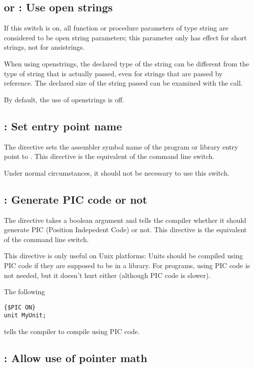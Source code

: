 \subsection{ or  : Use open strings}

If this switch is on, all function or procedure parameters of type string
are considered to be open string parameters; this parameter only has effect
for short strings, not for ansistrings.

When using openstrings, the declared type of the string can be different
from the type of string that is actually passed, even for strings that are
passed by reference. The declared size of the string passed can be examined
with the  call.

By default, the use of openstrings is off.

\subsection{ : Set entry point name}
\label{se:Pascalmainname}
The  directive sets the assembler
symbol name of the program or library entry point to .
This directive is the equivalent of the  command line switch.

Under normal circumstances, it should not be necessary to use this
switch.

\subsection{ : Generate PIC code or not}
\label{se:Pic}
The  directive takes a boolean argument and tells the
compiler whether it should generate PIC (Position Indepedent Code) or not.
This directive is the equivalent of the  command line switch.


This directive is only useful on Unix platforms: Units should be compiled 
using PIC code if they are supposed to be in a library. For programs, using
PIC code is not needed, but it doesn't hurt either (although PIC code is
slower).

The following 
\begin{verbatim}
{$PIC ON}
unit MyUnit;
\end{verbatim}
tells the compiler to compile  using PIC code.

\subsection{ : Allow use of pointer math}

